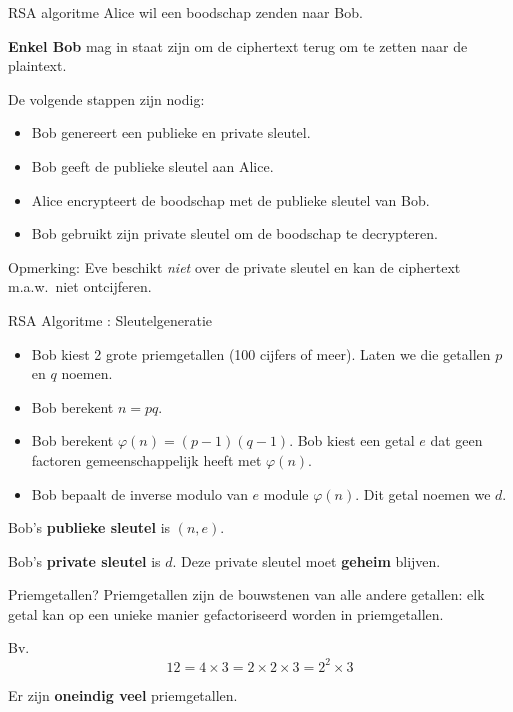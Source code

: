 \documentclass{beamer}
\begin{document}

\begin{frame}{RSA algoritme}
Alice wil een boodschap zenden naar Bob. 

\textbf{Enkel Bob} mag in staat zijn om de ciphertext terug om te zetten naar de plaintext.

De volgende stappen zijn nodig:

\begin{itemize}
	\item Bob genereert een publieke en private sleutel.
	\item Bob geeft de publieke sleutel aan Alice.
	\item Alice encrypteert de boodschap met de publieke sleutel van Bob.
	\item Bob gebruikt zijn private sleutel om de boodschap te decrypteren.
\end{itemize}

Opmerking: Eve beschikt \emph{niet}\/ over de private sleutel en kan de ciphertext 
m.a.w.\ niet ontcijferen.
\end{frame}

\begin{frame}{RSA Algoritme : Sleutelgeneratie}
\begin{itemize}
\item Bob kiest 2 grote priemgetallen (100 cijfers of meer). Laten we die getallen $p$ en $q$ noemen.
\item Bob berekent $n = p q$.	
\item Bob berekent $\varphi(n) = (p-1)(q-1)$. Bob kiest een getal $e$ dat geen factoren gemeenschappelijk heeft met $\varphi(n)$.
\item Bob bepaalt  de inverse modulo van $e$ module $\varphi(n)$. Dit getal noemen we $d$.
\end{itemize}

Bob's \textbf{publieke sleutel} is $(n, e)$.

\vspace{0.5cm}
Bob's \textbf{private sleutel} is $d$.  Deze private sleutel moet \textbf{geheim}
blijven.

\end{frame}

\begin{frame}{Priemgetallen?}
	Priemgetallen zijn de bouwstenen van alle andere getallen:  elk getal kan op een unieke manier gefactoriseerd worden in priemgetallen. 
	
	\vspace{0.5cm}
	Bv. 
	\[
		12 = 4 \times 3 = 2 \times 2 \times 3 = 2^2 \times 3
	\]
	
	\vspace{0.5cm}
	Er zijn \textbf{oneindig veel} priemgetallen.
\end{frame}
\end{document}
